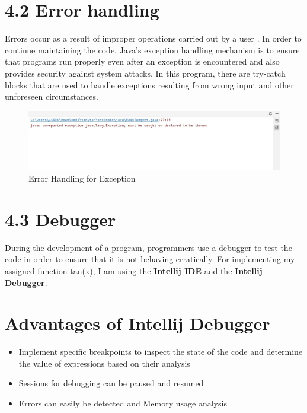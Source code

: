 \documentclass[12pt]{article}
\begin{document}
\pagebreak
\section*{4.2 Error handling}
Errors occur as a result of improper operations carried out by a user \textbf{\cite{error_link}}. In order to continue maintaining the code, Java's exception handling mechanism is to ensure that programs run properly even after an exception is encountered and also provides security against system attacks\textbf{\cite{errorst_link}}.
In this program, there are try-catch blocks that are used to handle exceptions resulting from wrong input and other unforeseen circumstances.
\newline
\begin{figure}[h!]
\centering
            \includegraphics[width=12cm]{exception.png}
                \caption{Error Handling for Exception}
        \end{figure}


\section*{4.3 Debugger \cite{techopedia_link}\cite{javatpoint_link}\cite{jetbrains_link}\cite{gceasy_link}}
During the development of a program, programmers use a debugger to test the code in order to ensure that it is not behaving erratically. 
For implementing my assigned function tan(x), I am using the \textbf{Intellij IDE} and the \textbf{Intellij Debugger}.
\pagebreak
\section*{Advantages of Intellij Debugger}
    \begin{itemize}
        \item Implement specific breakpoints to inspect the state of the code and determine the value of expressions based on their analysis
        \item Sessions for debugging can be paused and resumed
        \item Errors can easily be detected and Memory usage analysis
    \end{itemize}
\end{document}
